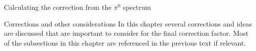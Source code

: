 \documentclass[ALICE]{ALICE_analysis_notes}
\newcommand{\PZ}{$\pi^0$\xspace}
\begin{document}
\begin{section}{Calculating the correction from the \PZ spectrum}
	
\end{section}

\newpage

\begin{section}{Corrections and other considerations}
	In this chapter several corrections and ideas are discussed that are important to consider for the final correction factor.
	Most of the subsections in this chapter are referenced in the previous text if relevant.\\
	
%
%

\end{section}
\end{document}
